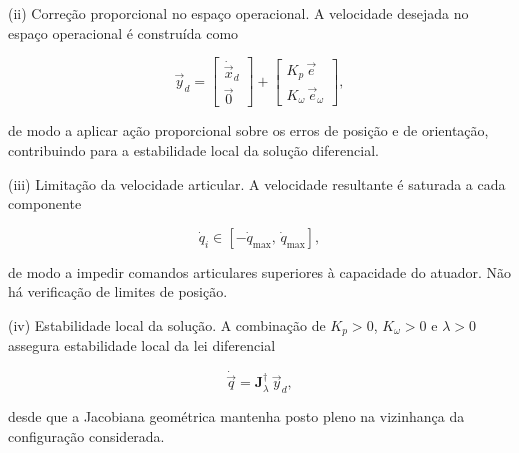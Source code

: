 (ii) Correção proporcional no espaço operacional.  
A velocidade desejada no espaço operacional é construída como

\begin{equation}
\vec{y}_{d}
=
\begin{bmatrix}
\dot{\vec{x}}_{d} \\
\vec{0}
\end{bmatrix}
+
\begin{bmatrix}
K_{p}\,\vec{e} \\
K_{\omega}\,\vec{e}_{\omega}
\end{bmatrix},
\end{equation}

de modo a aplicar ação proporcional sobre os erros de posição e de orientação, contribuindo para a estabilidade local da solução diferencial.

(iii) Limitação da velocidade articular.  
A velocidade resultante é saturada a cada componente

\begin{equation}
\dot{q}_{i}
\in
[-\dot{q}_{\max},\,\dot{q}_{\max}],
\end{equation}

de modo a impedir comandos articulares superiores à capacidade do atuador. Não há verificação de limites de posição.

(iv) Estabilidade local da solução.  
A combinação de $K_{p}>0$, $K_{\omega}>0$ e $\lambda>0$ assegura estabilidade local da lei diferencial

\begin{equation}
\dot{\vec{q}}
=
\mathbf{J}_{\lambda}^{\dagger}\,\vec{y}_{d},
\end{equation}

desde que a Jacobiana geométrica mantenha posto pleno na vizinhança da configuração considerada.